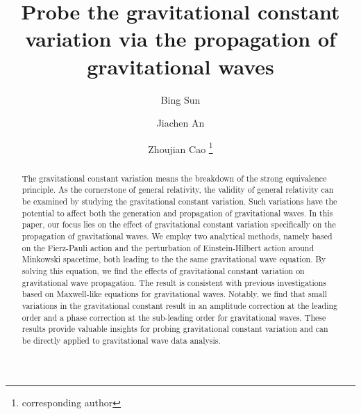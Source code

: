 \documentclass[prd,aps,a4paper,superscriptaddress,onecolumn,nofootinbib]{revtex4}
\begin{document}
\title{Probe the gravitational constant variation via the propagation of gravitational waves}

\author{Bing Sun} %

\author{Jiachen An} %

\author{Zhoujian Cao
\footnote{corresponding author}} 

\begin{abstract}
The gravitational constant variation means the breakdown of the strong equivalence principle.
As the cornerstone of general relativity, the validity of general relativity can be examined by studying the gravitational constant variation.
Such variations have the potential to affect both the generation and propagation of gravitational waves.
In this paper, our focus lies on the effect of gravitational constant variation specifically on the propagation of gravitational waves.
We employ two analytical methods, namely based on the Fierz-Pauli action and the perturbation of Einstein-Hilbert action around Minkowski spacetime, both leading to the the same gravitational wave equation.
By solving this equation, we find the effects of gravitational constant variation on gravitational wave propagation.
The result is consistent with previous investigations based on Maxwell-like equations for gravitational waves.
Notably, we find that small variations in the gravitational constant result in an amplitude correction at the leading order and a phase correction at the sub-leading order for gravitational waves.
These results provide valuable insights for probing gravitational constant variation and can be directly applied to gravitational wave data analysis.
\end{abstract}
\end{document}
